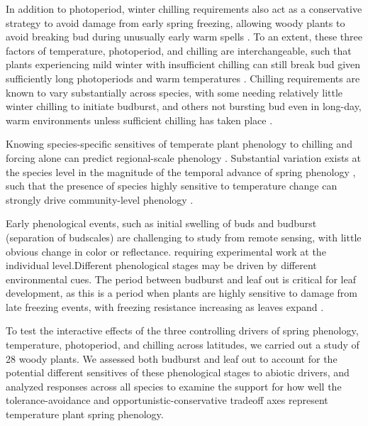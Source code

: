 \documentclass[11pt]{article}
\begin{document}
In addition to photoperiod, winter chilling requirements also act as a conservative strategy to avoid damage from early spring freezing, allowing woody plants to avoid breaking bud during unusually early warm spells \cite{Ghelardini:2010aa}. To an extent, these three factors of temperature, photoperiod, and chilling are interchangeable, such that plants experiencing mild winter with insufficient chilling can still break bud given sufficiently long photoperiods and warm temperatures \cite{Heide:1993b}. Chilling requirements are known to vary substantially across species, with some needing relatively little winter chilling to initiate budburst, and others not bursting bud even in long-day, warm environments unless sufficient chilling has taken place \cite{Korner:2010}. 

Knowing species-specific sensitives of temperate plant phenology to chilling and forcing alone can predict regional-scale phenology \cite{Chuine:2000}. Substantial variation exists at the species level in the magnitude of the temporal advance of spring phenology \cite{Primack:2009aa}, such that the presence of species highly sensitive to temperature change can strongly drive community-level phenology \cite{Diez:2012}.

Early phenological events, such as initial swelling of buds and budburst (separation of budscales) are challenging to study from remote sensing, with little obvious change in color or reflectance. 
requiring experimental work at the individual level.Different phenological stages may be driven by different environmental cues. The period between budburst and leaf out is critical for leaf development, as this is a period when plants are highly sensitive to damage from late freezing events, with freezing resistance increasing as leaves expand \cite{Sakai:1987aa}.

To test the interactive effects of the three controlling drivers of spring phenology, temperature, photoperiod, and chilling across latitudes, we carried out a study of 28 woody plants. We assessed both budburst and leaf out to account for the potential different sensitives of these phenological stages to abiotic drivers, and analyzed responses across all species to examine the support for how well the tolerance-avoidance and opportunistic-conservative tradeoff axes represent temperature plant spring phenology.
\end{document}
